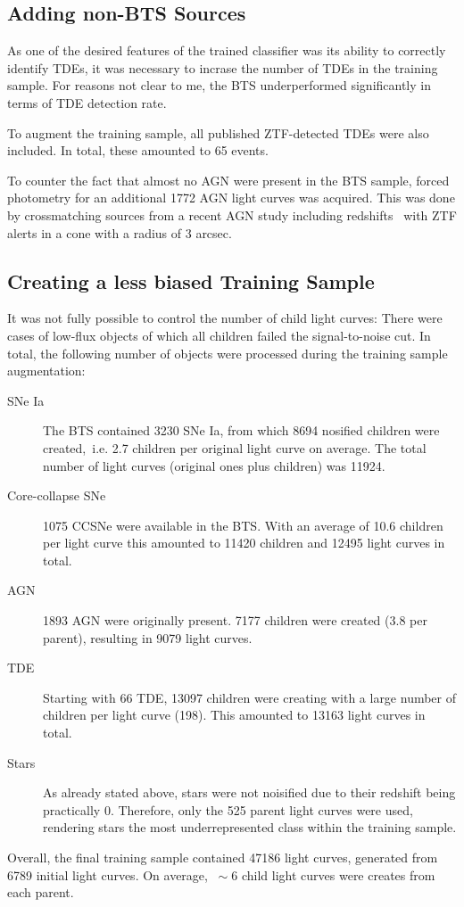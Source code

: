 \subsection{Adding non-BTS Sources}\label{addsources}
As one of the desired features of the trained classifier was its ability to correctly identify TDEs, it was necessary to incrase the number of TDEs in the training sample. For reasons not clear to me, the BTS underperformed significantly in terms of TDE detection rate.

To augment the training sample, all published ZTF-detected TDEs were also included. In total, these amounted to 65 events.

To counter the fact that almost no AGN were present in the BTS sample, forced photometry for an additional 1772 AGN light curves was acquired. This was done by crossmatching sources from a recent AGN study including redshifts~ with ZTF alerts in a cone with a radius of 3 arcsec.

\subsection{Creating a less biased Training Sample}
It was not fully possible to control the number of child light curves: There were cases of low-flux objects of which all children failed the signal-to-noise cut. In total, the following number of objects were processed during the training sample augmentation:
\begin{description}
  \item[SNe Ia] The BTS contained 3230 SNe Ia, from which 8694 nosified children were created,~i.e. 2.7 children per original light curve on average. The total number of light curves (original ones plus children) was 11924.
  \item[Core-collapse SNe] 1075 CCSNe were available in the BTS. With an average of 10.6 children per light curve this amounted to 11420 children and 12495 light curves in total.
  \item[AGN] 1893 AGN were originally present. 7177 children were created (3.8 per parent), resulting in 9079 light curves.
  \item[TDE] Starting with 66 TDE, 13097 children were creating with a large number of children per light curve (198). This amounted to 13163 light curves in total.
  \item[Stars] As already stated above, stars were not noisified due to their redshift being practically 0. Therefore, only the 525 parent light curves were used, rendering stars the most underrepresented class within the training sample.
\end{description}
Overall, the final training sample contained 47186 light curves, generated from 6789 initial light curves. On average, $~\sim 6$ child light curves were creates from each parent.

